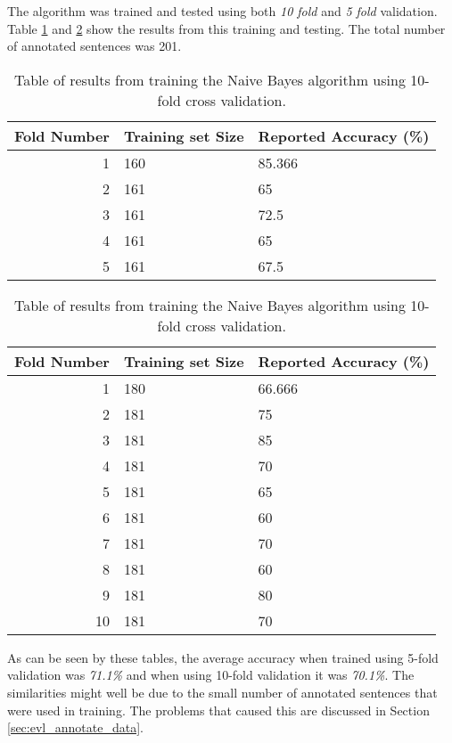 The algorithm was trained and tested using both \emph{10 fold} and \emph{5 fold} validation. Table \ref{tbl:naive_bayes_results_5} and \ref{tbl:naive_bayes_results_10} show the results from this training and testing. The total number of annotated sentences was 201.
\begin{table}[ht]
\centering
\begin{tabular}{r | l | l}
\textbf{Fold Number} & \textbf{Training set Size} & \textbf{Reported Accuracy (\%)} \\
\hline
1  & 160 & 85.366 \\
2  & 161 & 65 \\
3  & 161 & 72.5 \\
4  & 161 & 65 \\
5  & 161 & 67.5 \\

\end{tabular}
\caption{Table of results from training the Naive Bayes algorithm using 10-fold cross validation.}
\label{tbl:naive_bayes_results_5}
\end{table} 

\begin{table}[ht]
\centering
\begin{tabular}{r | l | l}
\textbf{Fold Number} & \textbf{Training set Size} & \textbf{Reported Accuracy (\%)} \\
\hline
1  & 180 & 66.666 \\
2  & 181 & 75 \\
3  & 181 & 85 \\
4  & 181 & 70 \\
5  & 181 & 65 \\
6  & 181 & 60 \\
7  & 181 & 70 \\
8  & 181 & 60 \\
9  & 181 & 80 \\
10 & 181 & 70 \\

\end{tabular}
\caption{Table of results from training the Naive Bayes algorithm using 10-fold cross validation.}
\label{tbl:naive_bayes_results_10}
\end{table} 

As can be seen by these tables, the average accuracy when trained using 5-fold validation was \emph{71.1\%} and when using 10-fold validation it was \emph{70.1\%}. The similarities might well be due to the small number of annotated sentences that were used in training. The problems that caused this are discussed in Section \ref{sec:evl_annotate_data}.

